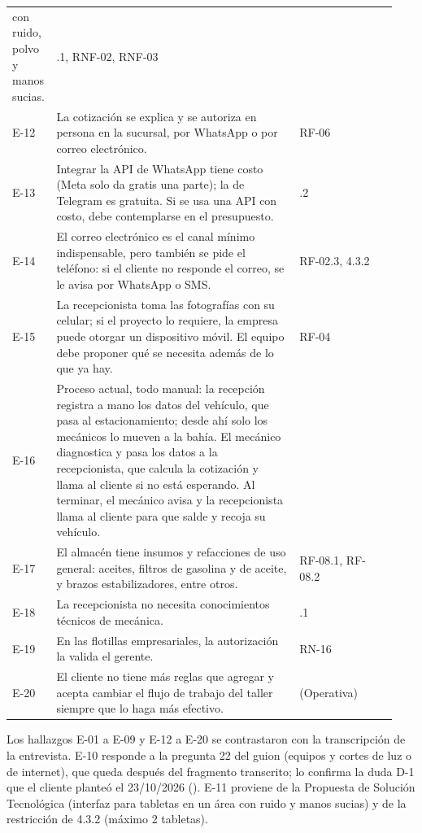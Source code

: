 {\begin{longtable}[]{@{}
  >{\raggedright\arraybackslash}p{0.07\linewidth}
  >{\raggedright\arraybackslash}p{0.62\linewidth}
  >{\raggedright\arraybackslash}p{0.25\linewidth}@{}}
con ruido, polvo y manos sucias. & 4.3.1, RNF-02, RNF-03 \\
E-12 & La cotización se explica y se autoriza en persona en la sucursal,
por WhatsApp o por correo electrónico. & RF-06 \\
E-13 & Integrar la API de WhatsApp tiene costo (Meta solo da gratis una
parte); la de Telegram es gratuita. Si se usa una API con costo, debe
contemplarse en el presupuesto. & 4.3.2 \\
E-14 & El correo electrónico es el canal mínimo indispensable, pero
también se pide el teléfono: si el cliente no responde el correo, se le
avisa por WhatsApp o SMS. & RF-02.3, 4.3.2 \\
E-15 & La recepcionista toma las fotografías con su celular; si el
proyecto lo requiere, la empresa puede otorgar un dispositivo móvil. El
equipo debe proponer qué se necesita además de lo que ya hay. & RF-04 \\
E-16 & Proceso actual, todo manual: la recepción registra a mano los
datos del vehículo, que pasa al estacionamiento; desde ahí solo los
mecánicos lo mueven a la bahía. El mecánico diagnostica y pasa los datos
a la recepcionista, que calcula la cotización y llama al cliente si no
está esperando. Al terminar, el mecánico avisa y la recepcionista llama
al cliente para que salde y recoja su vehículo. & 3.5 \\
E-17 & El almacén tiene insumos y refacciones de uso general: aceites,
filtros de gasolina y de aceite, y brazos estabilizadores, entre
otros. & RF-08.1, RF-08.2 \\
E-18 & La recepcionista no necesita conocimientos técnicos de
mecánica. & 4.3.1 \\
E-19 & En las flotillas empresariales, la autorización la valida el
gerente. & RN-16 \\
E-20 & El cliente no tiene más reglas que agregar y acepta cambiar el
flujo de trabajo del taller siempre que lo haga más efectivo. & 3.6
(Operativa) \\
\end{longtable}
}

Los hallazgos E-01 a E-09 y E-12 a E-20 se contrastaron con la
transcripción de la entrevista. E-10 responde a la pregunta 22 del guion
(equipos y cortes de luz o de internet), que queda después del fragmento
transcrito; lo confirma la duda D-1 que el cliente planteó el 23/10/2026
(). E-11
proviene de la Propuesta de Solución Tecnológica (interfaz para tabletas en
un área con ruido y manos sucias) y de la restricción de 4.3.2 (máximo 2
tabletas).

